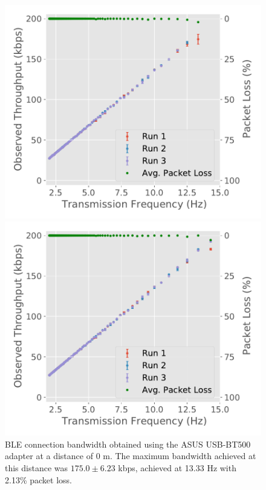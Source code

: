\begin{figure}[H]
    \centering
    \begin{minipage}{0.45\linewidth}
        \centering
        \includegraphics[width=\linewidth]{images/ble-bandwidth-hci0-0cm.pdf}
        \caption[\acs{BLE} connection bandwidth obtained using the ASUS USB-BT500 adapter at a distance of 0 m.]{\acs{BLE} connection bandwidth obtained using the ASUS USB-BT500 adapter at a distance of $0\text{ m}$. The maximum bandwidth achieved at this distance was $175.0 \pm 6.23$ kbps, achieved at 13.33 Hz with 2.13\% packet loss.}
        \label{fig:ble-bandwidth-hci0-0m}
    \end{minipage}
    \hspace{0.05\linewidth}
    \begin{minipage}{0.45\linewidth}
        \centering
        \includegraphics[width=\linewidth]{images/ble-bandwidth-hci0-300cm.pdf}

\end{minipage}
\end{figure}
